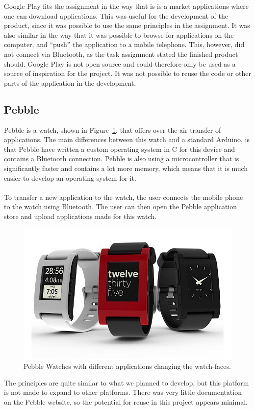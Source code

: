Google Play fits the assignment in the way that is is a market applications where one can download applications. This was useful for the development of the product, since it was possible to use the same principles in the assignment. It was also similar in the way that it was possible to browse for applications on the computer, and ``push'' the application to a mobile telephone. This, however, did not connect via Bluetooth, as the task assignment stated the finished product should. Google Play is not open source and could therefore only be used as a source of inspiration for the project. It was not possible to reuse the code or other parts of the application in the development.



\subsection{Pebble}
\label{sec:pebblewatch}
Pebble is a watch, shown in Figure~\ref{fig:pebblewatch}, that offers over the air transfer of applications. The main differences between this watch and a standard Arduino, is that Pebble have written a custom operating system in C for this device and contains a Bluetooth connection. Pebble is also using a microcontroller that is significantly faster and contains a lot more memory, which means that it is much easier to develop an operating system for it.\\
\\
To transfer a new application to the watch, the user connects the mobile phone to the watch using Bluetooth. The user can then open the Pebble application store and upload applications made for this watch.

\begin{figure}[H]
\includegraphics[scale=0.7]{images/Pebble-Smartphone-Watch.jpeg}
\caption[Pebble watch]{Pebble Watches with different applications changing the watch-faces.}
\label{fig:pebblewatch}
\end{figure}
The principles are quite similar to what we planned to develop, but this platform is not made to expand to other platforms. There was very little documentation on the Pebble website, so the potential for reuse in this project appears minimal.

